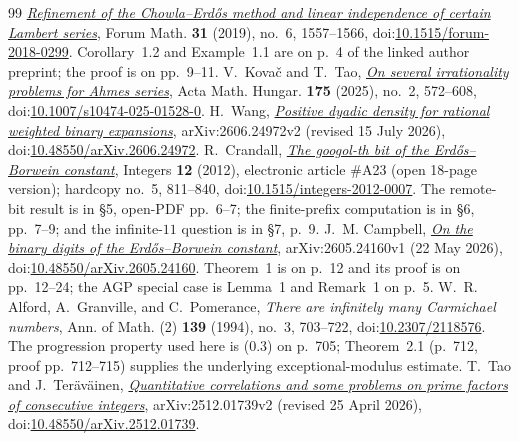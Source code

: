 \documentclass[11pt]{article}
\theoremstyle{definition}
\theoremstyle{remark}
\begin{document}
\begin{thebibliography}{99}
  \href{https://danielduverney.fr/documents/theorie-des-nombres/DuverneyTachiya190522.pdf}
  {\emph{Refinement of the Chowla--Erd\H{o}s method and linear independence
  of certain Lambert series}}, Forum Math. \textbf{31} (2019), no.~6,
  1557--1566,
  doi:\href{https://doi.org/10.1515/forum-2018-0299}{10.1515/forum-2018-0299}.
  Corollary~1.2 and Example~1.1 are on p.~4 of the linked author preprint;
  the proof is on pp.~9--11.
 V.~Kova\v{c} and T.~Tao,
  \href{https://arxiv.org/abs/2406.17593v4}{\emph{On several irrationality problems for
  Ahmes series}}, Acta Math. Hungar. \textbf{175} (2025), no.~2, 572--608,
  doi:\href{https://doi.org/10.1007/s10474-025-01528-0}{10.1007/s10474-025-01528-0}.
 H.~Wang,
  \href{https://arxiv.org/abs/2606.24972v2}{\emph{Positive dyadic density for
  rational weighted binary expansions}}, arXiv:2606.24972v2
  (revised 15 July 2026),
  doi:\href{https://doi.org/10.48550/arXiv.2606.24972}{10.48550/arXiv.2606.24972}.
 R.~Crandall,
  \href{https://math.colgate.edu/~integers/m23/m23.pdf}
  {\emph{The googol-th bit of the Erd\H{o}s--Borwein constant}},
  Integers \textbf{12} (2012), electronic article \#A23 (open 18-page
  version); hardcopy no.~5, 811--840,
  doi:\href{https://doi.org/10.1515/integers-2012-0007}{10.1515/integers-2012-0007}.
  The remote-bit result is in \S5, open-PDF pp.~6--7; the finite-prefix
  computation is in \S6, pp.~7--9; and the infinite-\(11\) question is in
  \S7, p.~9.
 J.~M. Campbell,
  \href{https://arxiv.org/abs/2605.24160v1}{\emph{On the binary digits of the
  Erd\H{o}s--Borwein constant}}, arXiv:2605.24160v1 (22 May 2026),
  doi:\href{https://doi.org/10.48550/arXiv.2605.24160}{10.48550/arXiv.2605.24160}.
  Theorem~1 is on p.~12 and its proof is on pp.~12--24; the AGP special
  case is Lemma~1 and Remark~1 on p.~5.
 W.~R. Alford, A.~Granville, and C.~Pomerance,
  \emph{There are infinitely many Carmichael numbers}, Ann. of Math. (2)
  \textbf{139} (1994), no.~3, 703--722,
  doi:\href{https://doi.org/10.2307/2118576}{10.2307/2118576}.
  The progression property used here is (0.3) on p.~705; Theorem~2.1
  (p.~712, proof pp.~712--715) supplies the underlying
  exceptional-modulus estimate.
 T.~Tao and J.~Ter\"av\"ainen,
  \href{https://arxiv.org/abs/2512.01739v2}{\emph{Quantitative correlations and
  some problems on prime factors of consecutive integers}}, arXiv:2512.01739v2
  (revised 25 April 2026),
  doi:\href{https://doi.org/10.48550/arXiv.2512.01739}{10.48550/arXiv.2512.01739}.

\end{thebibliography}
\end{document}
